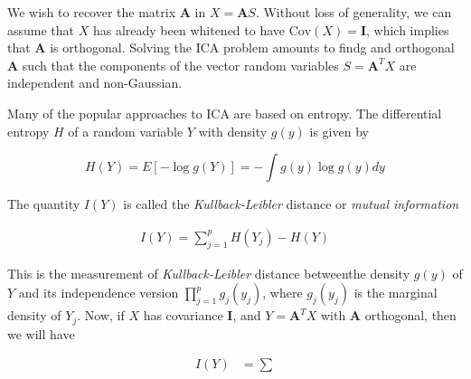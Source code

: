 \documentclass{article}
\begin{document}
We wish to recover the matrix $\pmb A$ in $X = \pmb A S$. Without loss of generality, we can assume that $X$ has already been whitened to have $\text{Cov}(X) = \mathbf I$, which implies that $\pmb A$ is orthogonal. Solving the ICA problem amounts to findg and orthogonal $\pmb A$ such that the components of the vector random variables $S = \pmb A^T X$ are independent and non-Gaussian.

Many of the popular approaches to ICA are based on entropy. The differential entropy $H$ of a random variable $Y$ with density $g(y)$ is given by

\begin{equation}
	H(Y) = E[-\log g(Y)] = -\int g(y)\log g(y) dy
\end{equation}

The quantity $I(Y)$ is called the \textit{Kullback-Leibler} distance or \textit{mutual information}

\begin{equation}
\begin{aligned}
		I(Y) = \sum_{j=1}^p H(Y_j) - H(Y)
\end{aligned}
\end{equation}


This is the measurement of \textit{Kullback-Leibler} distance betweenthe density $g(y)$ of $Y$ and its independence version $\prod_{j=1}^p g_j(y_j)$, where $g_j(y_j)$ is the marginal density of $Y_j$. Now, if $X$ has covariance $\mathbf I$, and $Y = \pmb A^T X$ with $\pmb A$ orthogonal, then we will have

\begin{align}
	I(Y) & = \sum
\end{align}
\end{document}
